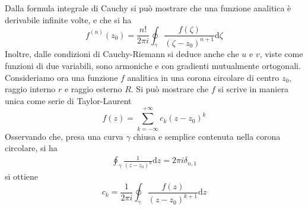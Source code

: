 \documentclass[a4paper,11pt]{book}
\renewcommand{\d}{\mathrm{d}}
\theoremstyle{theorem}
\theoremstyle{definition}
\begin{document}
\noindent Dalla formula integrale di Cauchy si può mostrare che una funzione analitica è derivabile infinite volte, e che si ha
\[f^{(n)}(z_0)=\frac{n!}{2\pi i}\oint_\gamma\frac{f(\zeta)}{(\zeta-z_0)^{n+1}}\d\zeta\]
Inoltre, dalle condizioni di Cauchy-Riemann si deduce anche che $u$ e $v$, viste come funzioni di due variabili, sono armoniche e con gradienti mutualmente ortogonali. Consideriamo ora una funzione $f$ analitica in una corona circolare di centro $z_0$, raggio interno $r$ e raggio esterno $R$. Si può mostrare che $f$ si scrive in maniera unica come serie di Taylor-Laurent
\[f(z)=\sum_{k=-\infty}^{+\infty}c_k(z-z_0)^k\]
Osservando che, presa una curva $\gamma$ chiusa e semplice contenuta nella corona circolare, si ha
\begin{align*}
	\oint_\gamma\frac{1}{(z-z_0)^n}\d z=2\pi i\delta_{n,1}
\end{align*}
si ottiene
\[c_k=\frac{1}{2\pi i}\oint_\gamma\frac{f(z)}{(z-z_0)^{k+1}}\d z\]
\end{document}
